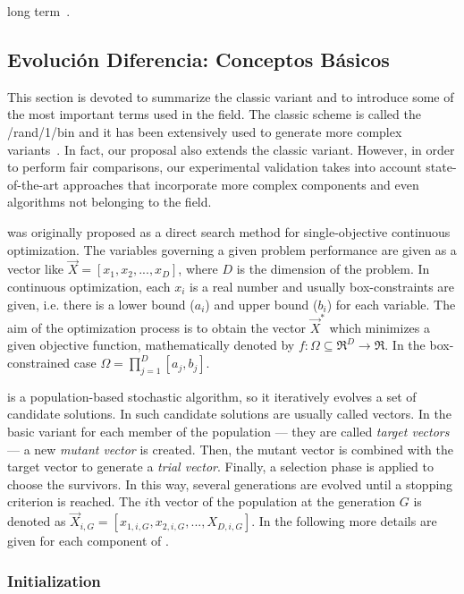 long term~\cite{montgomery2010analysis}.
\subsection{Evolución Diferencia: Conceptos Básicos}

This section is devoted to summarize the classic \DE{} variant and to introduce some of the most important terms used in the \DE{} field.
%
The classic \DE{} scheme is called the \DE{}/rand/1/bin and it has been extensively used to generate more complex \DE{} variants~\cite{das2011differential}.
%
In fact, our proposal also extends the classic variant.
%
However, in order to perform fair comparisons,
our experimental validation takes into account state-of-the-art approaches that incorporate more complex 
components and even algorithms not belonging to the \DE{} field.

\DE{} was originally proposed as a direct search method for single-objective continuous optimization.
%
The variables governing a given problem performance are given as a vector like $\vec{X} = [x_1, x_2, ..., x_D]$, where $D$ is the
dimension of the problem.
%
In continuous optimization, each $x_i$ is a real number and usually box-constraints are given, i.e. there is a lower bound ($a_{i}$) and
upper bound ($b_{i}$) for each variable.
%
The aim of the optimization process is to obtain the vector $\vec{X}^*$ which minimizes a given objective function, mathematically 
denoted by $f : \Omega \subseteq \Re^D \rightarrow \Re$.
%
In the box-constrained case $\Omega = {\prod}_{j=1}^{D} [a_{j}, b_{j}]$.

\DE{} is a population-based stochastic algorithm, so it iteratively evolves a set of candidate solutions.
%
In \DE{} such candidate solutions are usually called vectors.
%
In the basic \DE{} variant for each member of the population --- they are called \textit{target vectors} --- a new \textit{mutant vector}
is created.
%
Then, the mutant vector is combined with the target vector to generate a \textit{trial vector}.
%
Finally, a selection phase is applied to choose the survivors.
%
In this way, several generations are evolved until a stopping criterion is reached.
%
The $i$th vector of the population at the generation $G$ is denoted as $\vec{X}_{i,G} = [x_{1,i,G}, x_{2,i,G},..., X_{D,i, G}]$.
%
In the following more details are given for each component of \DE{}.


\subsubsection{Initialization}

